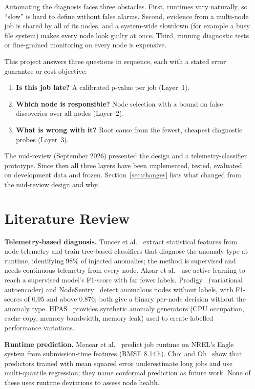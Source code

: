 \documentclass[10pt,a4paper]{article}
\begin{document}
Automating the diagnosis faces three obstacles. First, runtimes vary naturally, so ``slow'' is hard to define without false alarms. Second, evidence from a multi-node job is shared by all of its nodes, and a system-wide slowdown (for example a busy file system) makes every node look guilty at once. Third, running diagnostic tests or fine-grained monitoring on every node is expensive.

This project answers three questions in sequence, each with a stated error guarantee or cost objective:
\begin{enumerate}
\item \textbf{Is this job late?} A calibrated p-value per job (Layer~1).
\item \textbf{Which node is responsible?} Node selection with a bound on false discoveries over all nodes (Layer~2).
\item \textbf{What is wrong with it?} Root cause from the fewest, cheapest diagnostic probes (Layer~3).
\end{enumerate}
The mid-review (September 2026) presented the design and a telemetry-classifier prototype. Since then all three layers have been implemented, tested, evaluated on development data and frozen. Section~\ref{sec:changes} lists what changed from the mid-review design and why.

\section{Literature Review}
\textbf{Telemetry-based diagnosis.} Tuncer et al.~\cite{tuncer} extract statistical features from node telemetry and train tree-based classifiers that diagnose the anomaly type at runtime, identifying 98\% of injected anomalies; the method is supervised and needs continuous telemetry from every node. Aksar et al.~\cite{aksar} use active learning to reach a supervised model's F1-score with far fewer labels. Prodigy~\cite{prodigy} (variational autoencoder) and NodeSentry~\cite{nodesentry} detect anomalous nodes without labels, with F1-scores of 0.95 and above 0.876; both give a binary per-node decision without the anomaly type. HPAS~\cite{hpas} provides synthetic anomaly generators (CPU occupation, cache copy, memory bandwidth, memory leak) used to create labelled performance variations.

\textbf{Runtime prediction.} Menear et al.~\cite{menear} predict job runtime on NREL's Eagle system from submission-time features (RMSE 8.14\,h). Choi and Oh~\cite{uarp} show that predictors trained with mean squared error underestimate long jobs and use multi-quantile regression; they name conformal prediction as future work. None of these uses runtime deviations to assess node health.
\end{document}

